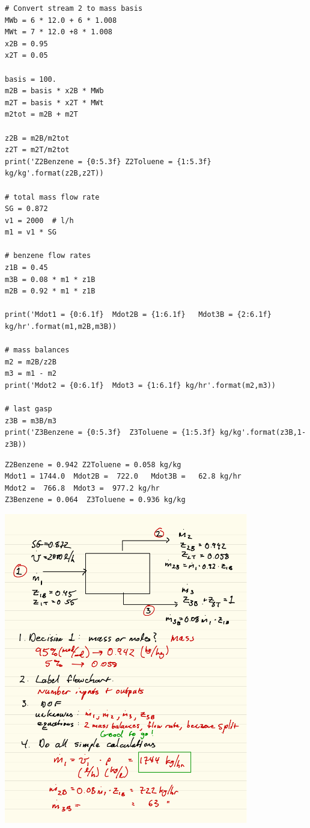 \documentclass[11pt]{article}
\begin{document}
\begin{verbatim}
# Convert stream 2 to mass basis
MWb = 6 * 12.0 + 6 * 1.008
MWt = 7 * 12.0 +8 * 1.008
x2B = 0.95
x2T = 0.05

basis = 100.
m2B = basis * x2B * MWb
m2T = basis * x2T * MWt
m2tot = m2B + m2T

z2B = m2B/m2tot
z2T = m2T/m2tot
print('Z2Benzene = {0:5.3f} Z2Toluene = {1:5.3f} kg/kg'.format(z2B,z2T))

# total mass flow rate
SG = 0.872
v1 = 2000  # l/h
m1 = v1 * SG

# benzene flow rates
z1B = 0.45
m3B = 0.08 * m1 * z1B
m2B = 0.92 * m1 * z1B

print('Mdot1 = {0:6.1f}  Mdot2B = {1:6.1f}   Mdot3B = {2:6.1f} kg/hr'.format(m1,m2B,m3B))

# mass balances
m2 = m2B/z2B
m3 = m1 - m2
print('Mdot2 = {0:6.1f}  Mdot3 = {1:6.1f} kg/hr'.format(m2,m3))

# last gasp
z3B = m3B/m3
print('Z3Benzene = {0:5.3f}  Z3Toluene = {1:5.3f} kg/kg'.format(z3B,1-z3B))
\end{verbatim}

\begin{verbatim}
Z2Benzene = 0.942 Z2Toluene = 0.058 kg/kg
Mdot1 = 1744.0  Mdot2B =  722.0   Mdot3B =   62.8 kg/hr
Mdot2 =  766.8  Mdot3 =  977.2 kg/hr
Z3Benzene = 0.064  Z3Toluene = 0.936 kg/kg
\end{verbatim}

\includegraphics[width=0.8\textwidth]{./figs/Diff-balance5.png}
\end{document}
